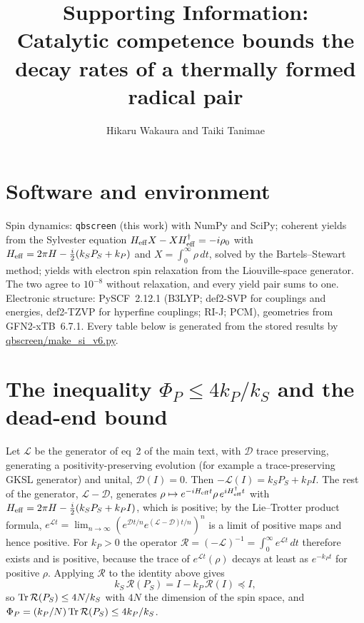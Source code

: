 \documentclass[11pt]{article}
\title{Supporting Information:\\ Catalytic competence bounds the decay rates of
a thermally formed radical pair}
\author{Hikaru Wakaura and Taiki Tanimae}
\date{}
\begin{document}
\maketitle

\section{Software and environment}
Spin dynamics: \texttt{qbscreen} (this work) with NumPy and SciPy; coherent
yields from the Sylvester equation
$H_{\rm eff}X - XH_{\rm eff}^\dagger = -i\rho_0$ with
$H_{\rm eff} = 2\pi H - \tfrac{i}{2}(k_SP_S + k_P)$ and $X = \int_0^\infty\rho\,dt$,
solved by the Bartels--Stewart method;\cite{Bartels1972}
yields with electron spin relaxation from the Liouville-space generator. The two
agree to $10^{-8}$ without relaxation, and every yield pair sums to one.
Electronic structure: PySCF~2.12.1\cite{Sun2020} (B3LYP\cite{Becke1993,Lee1988};
def2-SVP for couplings and energies, def2-TZVP\cite{Weigend2005} for hyperfine
couplings; RI-J; PCM), geometries from GFN2-xTB~6.7.1.\cite{Bannwarth2019}
Every table below is generated from the stored results by
\url{qbscreen/make_si_v6.py}.

\section{The inequality $\Phi_P\le4k_P/k_S$ and the dead-end bound}
Let $\mathcal L$ be the generator of eq~2 of the main text, with $\mathcal D$
trace preserving, generating a positivity-preserving evolution (for example a
trace-preserving GKSL generator\cite{Gorini1976,Lindblad1976}) and unital,
$\mathcal D(I)=0$. Then $-\mathcal L(I) = k_SP_S + k_PI$. The rest of the
generator, $\mathcal L-\mathcal D$, generates
$\rho\mapsto e^{-iH_{\rm eff}t}\rho\,e^{iH_{\rm eff}^\dagger t}$ with
$H_{\rm eff} = 2\pi H - \tfrac i2(k_SP_S+k_PI)$, which is positive; by the
Lie--Trotter product formula,
$e^{\mathcal Lt} = \lim_{n\to\infty}(e^{\mathcal Dt/n}e^{(\mathcal L-\mathcal D)t/n})^n$
is a limit of positive maps and hence positive. For $k_P>0$ the operator
$\mathcal R = (-\mathcal L)^{-1} = \int_0^\infty e^{\mathcal Lt}\,dt$ therefore
exists and is positive, because the trace of $e^{\mathcal Lt}(\rho)$ decays at
least as $e^{-k_Pt}$ for positive $\rho$.
Applying $\mathcal R$ to the identity above gives
\begin{equation}
k_S\,\mathcal R(P_S) = I - k_P\,\mathcal R(I) \preceq I ,
\end{equation}
so ${\rm Tr}\,\mathcal R(P_S)\le 4N/k_S$ with $4N$ the dimension of the spin
space, and $\Phi_P = (k_P/N)\,{\rm Tr}\,\mathcal R(P_S)\le4k_P/k_S$.
\end{document}
